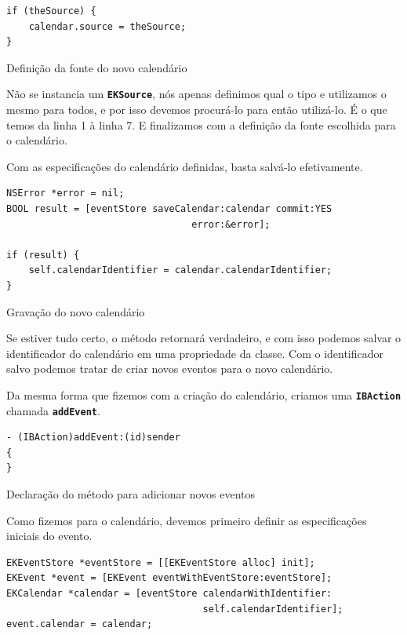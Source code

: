 \documentclass[a4paper,12pt,brazil,doubleside]{book}
\begin{document}
\begin{singlespace}
\begin{listing}[H]
\begin{verbatim}
if (theSource) {
    calendar.source = theSource;
}
\end{verbatim}
\caption{Definição da fonte do novo calendário}
\end{listing}


Não se instancia um \texttt{\textbf{EKSource}}, nós apenas definimos qual o tipo e utilizamos o mesmo para todos, e por isso devemos procurá-lo para então utilizá-lo. É o que temos da linha 1 à linha 7. E finalizamos com a definição da fonte escolhida para o calendário.

Com as especificações do calendário definidas, basta salvá-lo efetivamente.

\begin{listing}[H]
\begin{verbatim}
NSError *error = nil;
BOOL result = [eventStore saveCalendar:calendar commit:YES
                                 error:&error];

if (result) {
	self.calendarIdentifier = calendar.calendarIdentifier;
}
\end{verbatim}
\caption{Gravação do novo calendário}
\end{listing}


Se estiver tudo certo, o método retornará verdadeiro, e com isso podemos salvar o identificador do calendário em uma propriedade da classe. Com o identificador salvo podemos tratar de criar novos eventos para o novo calendário.

Da mesma forma que fizemos com a criação do calendário, criamos uma \texttt{\textbf{IBAction}} chamada \texttt{\textbf{addEvent}}.

\begin{listing}[H]
\begin{verbatim}
- (IBAction)addEvent:(id)sender
{
}
\end{verbatim}
\caption{Declaração do método para adicionar novos eventos}
\end{listing}


Como fizemos para o calendário, devemos primeiro definir as especificações iniciais do evento.

\begin{listing}[H]
\begin{verbatim}
EKEventStore *eventStore = [[EKEventStore alloc] init];
EKEvent *event = [EKEvent eventWithEventStore:eventStore];
EKCalendar *calendar = [eventStore calendarWithIdentifier:
                                   self.calendarIdentifier];
event.calendar = calendar;
    

\end{verbatim}
\end{listing}
\end{singlespace}
\end{document}
